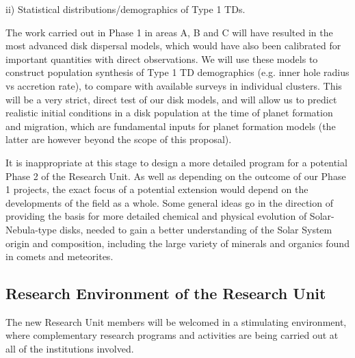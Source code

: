 \documentclass[10pt,fleqn,twoside]{article}
\begin{document}
\begin{Emphasize}
ii) Statistical distributions/demographics of Type 1 TDs. \\
\end{Emphasize}
The work carried out in Phase 1 in areas A, B and C will have resulted
in the most advanced disk dispersal models, which would have also been
calibrated for important quantities with direct observations. We will
use these models to construct population synthesis of Type 1
TD demographics (e.g. inner hole radius vs accretion
rate), to compare with available surveys in individual clusters.  
This will be a very strict, direct test of our disk models, and will
allow us to predict realistic initial conditions in a disk population at the
time of planet formation and migration, which are fundamental inputs
for planet formation models (the latter are however beyond the scope of this
proposal).  

It is inappropriate at this stage to design a more detailed program
for a potential Phase 2 of the Research Unit. As well as depending on
the outcome of our Phase 1 projects, the exact focus of a potential
extension would depend on the developments of the field as a
whole. Some general ideas go in the direction of providing the basis for more detailed chemical
and physical evolution of Solar-Nebula-type disks, needed to gain a
better understanding of the Solar System origin and composition,
including the large variety of minerals and organics found in comets
and meteorites. 
\vspace{0.8em}

\subsection{Research Environment of the Research Unit}

The new Research Unit members will be welcomed in a stimulating
environment, where complementary research programs and activities are
being carried out at all of the institutions involved. 
\vspace{1em}
\end{document}
